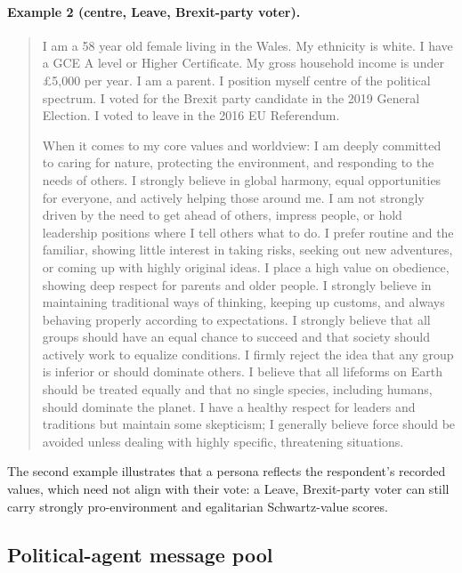 \documentclass[pdflatex,sn-mathphys-num]{sn-jnl}%
\theoremstyle{thmstyleone}%
\theoremstyle{thmstyletwo}%
\theoremstyle{thmstylethree}%
\begin{document}
\paragraph{Example 2 (centre, Leave, Brexit-party voter).}
\begin{quote}\small
I am a 58 year old female living in the Wales. My ethnicity is white. I have a GCE
A level or Higher Certificate. My gross household income is under \pounds5,000 per
year. I am a parent. I position myself centre of the political spectrum. I voted
for the Brexit party candidate in the 2019 General Election. I voted to leave in
the 2016 EU Referendum.

When it comes to my core values and worldview: I am deeply committed to caring for
nature, protecting the environment, and responding to the needs of others. I
strongly believe in global harmony, equal opportunities for everyone, and actively
helping those around me. I am not strongly driven by the need to get ahead of
others, impress people, or hold leadership positions where I tell others what to
do. I prefer routine and the familiar, showing little interest in taking risks,
seeking out new adventures, or coming up with highly original ideas. I place a high
value on obedience, showing deep respect for parents and older people. I strongly
believe in maintaining traditional ways of thinking, keeping up customs, and always
behaving properly according to expectations. I strongly believe that all groups
should have an equal chance to succeed and that society should actively work to
equalize conditions. I firmly reject the idea that any group is inferior or should
dominate others. I believe that all lifeforms on Earth should be treated equally
and that no single species, including humans, should dominate the planet. I have a
healthy respect for leaders and traditions but maintain some skepticism; I
generally believe force should be avoided unless dealing with highly specific,
threatening situations.
\end{quote}

The second example illustrates that a persona reflects the respondent's recorded
values, which need not align with their vote: a Leave, Brexit-party voter can still
carry strongly pro-environment and egalitarian Schwartz-value scores.

\subsection{Political-agent message pool}\label{subsec:si-political-briefs}
\end{document}
